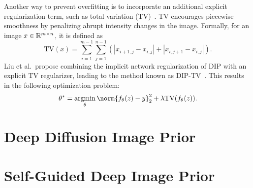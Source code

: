 Another way to prevent overfitting is to incorporate an additional explicit regularization term, such as total variation (TV)~\cite{TV}.
TV encourages piecewise smoothness by penalizing abrupt intensity changes in the image.
Formally, for an image $x \in \mathbb{R}^{m \times n}$, it is defined as
\begin{equation}
    \text{TV}(x) = \sum_{i=1}^{m-1} \sum_{j=1}^{n-1} (|x_{i+1,j} - x_{i,j}| + |x_{i,j+1} - x_{i,j}|).
\end{equation}
Liu et al.\ propose combining the implicit network regularization of DIP with an explicit TV regularizer, leading to the method known as DIP-TV~\cite{DIP-TV}. This results in the following optimization problem:
\begin{equation}
    \theta^* = \argmin_\theta \norm{f_\theta(z) - y}_2^2 + \lambda \text{TV}(f_\theta(z)).
\end{equation}

\section{Deep Diffusion Image Prior}


\section{Self-Guided Deep Image Prior}
